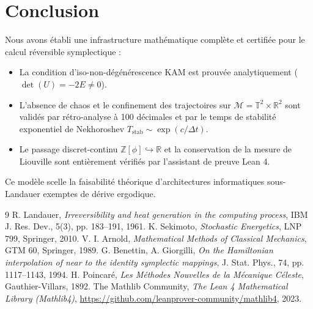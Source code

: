 \documentclass[10pt,twocolumn,a4paper]{article}
\theoremstyle{plain}
\theoremstyle{definition}
\begin{document}
\section{Conclusion}
Nous avons établi une infrastructure mathématique complète et certifiée pour le calcul réversible symplectique :
\begin{itemize}
    \item La condition d'iso-non-dégénérescence KAM est prouvée analytiquement ($\det(U) = -2E \neq 0$).
    \item L'absence de chaos et le confinement des trajectoires sur $\mathcal{M} = \mathbb{T}^2 \times \mathbb{R}^2$ sont validés par rétro-analyse à 100 décimales et par le temps de stabilité exponentiel de Nekhoroshev $T_{\text{stab}} \sim \exp(c/\Delta t)$.
    \item Le passage discret-continu $\mathbb{Z}[\phi] \hookrightarrow \mathbb{R}$ et la conservation de la mesure de Liouville sont entièrement vérifiés par l'assistant de preuve Lean 4.
\end{itemize}
Ce modèle scelle la faisabilité théorique d'architectures informatiques sous-Landauer exemptes de dérive ergodique.

\begin{thebibliography}{9}
\fontsize{6.5pt}{7.5pt}\selectfont
\setlength{\itemsep}{-0.5pt}
 R. Landauer, \emph{Irreversibility and heat generation in the computing process}, IBM J. Res. Dev., 5(3), pp. 183--191, 1961.
 K. Sekimoto, \emph{Stochastic Energetics}, LNP 799, Springer, 2010.
 V. I. Arnold, \emph{Mathematical Methods of Classical Mechanics}, GTM 60, Springer, 1989.
 G. Benettin, A. Giorgilli, \emph{On the Hamiltonian interpolation of near to the identity symplectic mappings}, J. Stat. Phys., 74, pp. 1117--1143, 1994.
 H. Poincaré, \emph{Les Méthodes Nouvelles de la Mécanique Céleste}, Gauthier-Villars, 1892.
 The Mathlib Community, \emph{The Lean 4 Mathematical Library (Mathlib4)}, \url{https://github.com/leanprover-community/mathlib4}, 2023.
\end{thebibliography}
\end{document}

